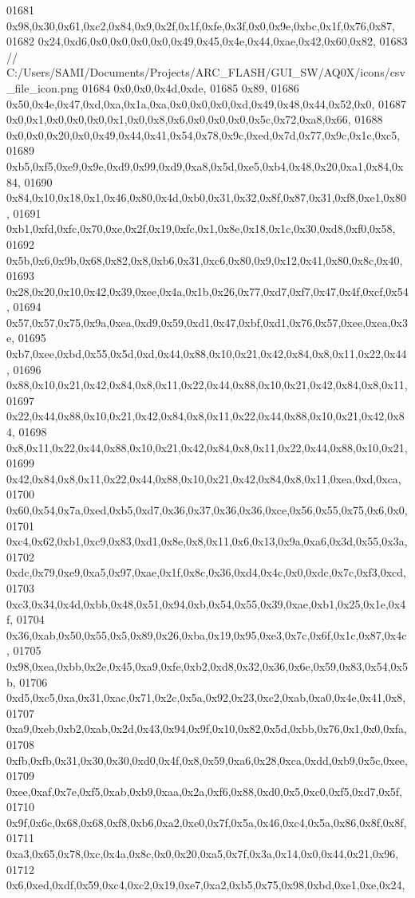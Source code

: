 \begin{DoxyCode}
01681   0x98,0x30,0x61,0xc2,0x84,0x9,0x2f,0x1f,0xfe,0x3f,0x0,0x9e,0xbc,0x1f,0x76,0x87,
01682   0x24,0xd6,0x0,0x0,0x0,0x0,0x49,0x45,0x4e,0x44,0xae,0x42,0x60,0x82,
01683     \textcolor{comment}{// C:/Users/SAMI/Documents/Projects/ARC\_FLASH/GUI\_SW/AQ0X/icons/csv\_file\_icon.png}
01684   0x0,0x0,0x4d,0xde,
01685   0x89,
01686   0x50,0x4e,0x47,0xd,0xa,0x1a,0xa,0x0,0x0,0x0,0xd,0x49,0x48,0x44,0x52,0x0,
01687   0x0,0x1,0x0,0x0,0x0,0x1,0x0,0x8,0x6,0x0,0x0,0x0,0x5c,0x72,0xa8,0x66,
01688   0x0,0x0,0x20,0x0,0x49,0x44,0x41,0x54,0x78,0x9c,0xed,0x7d,0x77,0x9c,0x1c,0xc5,
01689   0xb5,0xf5,0xe9,0x9e,0xd9,0x99,0xd9,0xa8,0x5d,0xe5,0xb4,0x48,0x20,0xa1,0x84,0x84,
01690   0x84,0x10,0x18,0x1,0x46,0x80,0x4d,0xb0,0x31,0x32,0x8f,0x87,0x31,0xf8,0xe1,0x80,
01691   0xb1,0xfd,0xfc,0x70,0xe,0x2f,0x19,0xfc,0x1,0x8e,0x18,0x1c,0x30,0xd8,0xf0,0x58,
01692   0x5b,0x6,0x9b,0x68,0x82,0x8,0xb6,0x31,0xc6,0x80,0x9,0x12,0x41,0x80,0x8c,0x40,
01693   0x28,0x20,0x10,0x42,0x39,0xee,0x4a,0x1b,0x26,0x77,0xd7,0xf7,0x47,0x4f,0xcf,0x54,
01694   0x57,0x57,0x75,0x9a,0xea,0xd9,0x59,0xd1,0x47,0xbf,0xd1,0x76,0x57,0xee,0xea,0x3e,
01695   0xb7,0xee,0xbd,0x55,0x5d,0xd,0x44,0x88,0x10,0x21,0x42,0x84,0x8,0x11,0x22,0x44,
01696   0x88,0x10,0x21,0x42,0x84,0x8,0x11,0x22,0x44,0x88,0x10,0x21,0x42,0x84,0x8,0x11,
01697   0x22,0x44,0x88,0x10,0x21,0x42,0x84,0x8,0x11,0x22,0x44,0x88,0x10,0x21,0x42,0x84,
01698   0x8,0x11,0x22,0x44,0x88,0x10,0x21,0x42,0x84,0x8,0x11,0x22,0x44,0x88,0x10,0x21,
01699   0x42,0x84,0x8,0x11,0x22,0x44,0x88,0x10,0x21,0x42,0x84,0x8,0x11,0xea,0xd,0xca,
01700   0x60,0x54,0x7a,0xed,0xb5,0xd7,0x36,0x37,0x36,0x36,0xce,0x56,0x55,0x75,0x6,0x0,
01701   0xc4,0x62,0xb1,0xc9,0x83,0xd1,0x8e,0x8,0x11,0x6,0x13,0x9a,0xa6,0x3d,0x55,0x3a,
01702   0xdc,0x79,0xe9,0xa5,0x97,0xae,0x1f,0x8c,0x36,0xd4,0x4c,0x0,0xdc,0x7c,0xf3,0xcd,
01703   0xc3,0x34,0x4d,0xbb,0x48,0x51,0x94,0xb,0x54,0x55,0x39,0xae,0xb1,0x25,0x1e,0x4f,
01704   0x36,0xab,0x50,0x55,0x5,0x89,0x26,0xba,0x19,0x95,0xe3,0x7c,0x6f,0x1c,0x87,0x4c,
01705   0x98,0xea,0xbb,0x2e,0x45,0xa9,0xfe,0xb2,0xd8,0x32,0x36,0x6e,0x59,0x83,0x54,0x5b,
01706   0xd5,0xc5,0xa,0x31,0xac,0x71,0x2c,0x5a,0x92,0x23,0xc2,0xab,0xa0,0x4e,0x41,0x8,
01707   0xa9,0xeb,0xb2,0xab,0x2d,0x43,0x94,0x9f,0x10,0x82,0x5d,0xbb,0x76,0x1,0x0,0xfa,
01708   0xfb,0xfb,0x31,0x30,0x30,0xd0,0x4f,0x8,0x59,0xa6,0x28,0xca,0xdd,0xb9,0x5c,0xee,
01709   0xee,0xaf,0x7e,0xf5,0xab,0xb9,0xaa,0x2a,0xf6,0x88,0xd0,0x5,0xc0,0xf5,0xd7,0x5f,
01710   0x9f,0x6c,0x68,0x68,0xf8,0xb6,0xa2,0xe0,0x7f,0x5a,0x46,0xc4,0x5a,0x86,0x8f,0x8f,
01711   0xa3,0x65,0x78,0xc,0x4a,0x8c,0x0,0x20,0xa5,0x7f,0x3a,0x14,0x0,0x44,0x21,0x96,
01712   0x6,0xed,0xdf,0x59,0xc4,0xc2,0x19,0xe7,0xa2,0xb5,0x75,0x98,0xbd,0xe1,0xe,0x24,

\end{DoxyCode}
